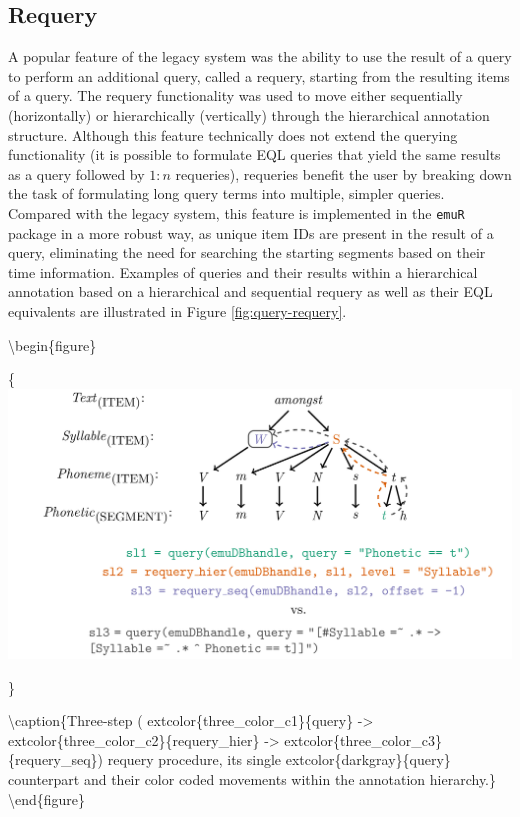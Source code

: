 \documentclass[]{book}
\begin{document}
\hypertarget{subsec:requery}{%
\subsection{Requery}\label{subsec:requery}}

A popular feature of the legacy system was the ability to use the result of a query to perform an additional query, called a requery, starting from the resulting items of a query. The requery functionality was used to move either sequentially (horizontally) or hierarchically (vertically) through the hierarchical annotation structure. Although this feature technically does not extend the querying functionality (it is possible to formulate EQL queries that yield the same results as a query followed by \(1:n\) requeries), requeries benefit the user by breaking down the task of formulating long query terms into multiple, simpler queries. Compared with the legacy system, this feature is implemented in the \texttt{emuR} package in a more robust way, as unique item IDs are present in the result of a query, eliminating the need for searching the starting segments based on their time information. Examples of queries and their results within a hierarchical annotation based on a hierarchical and sequential requery as well as their EQL equivalents are illustrated in Figure \ref{fig:query-requery}.

\textbackslash{}begin\{figure\}

\{\centering \includegraphics[width=0.75\linewidth]{pics/requery}

\}

\textbackslash{}caption\{Three-step ( extcolor\{three\_color\_c1\}\{query\} -\textgreater{} extcolor\{three\_color\_c2\}\{requery\_hier\} -\textgreater{} extcolor\{three\_color\_c3\}\{requery\_seq\}) requery procedure, its single extcolor\{darkgray\}\{query\} counterpart and their color coded movements within the annotation hierarchy.\}\label{fig:query-requery}
\textbackslash{}end\{figure\}
\end{document}

